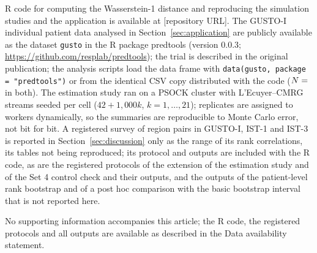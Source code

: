 \documentclass[AMA,Times1COL]{WileyNJDv5}
\begin{document}
R code for computing the Wasserstein-1 distance and reproducing the simulation studies and the application is available at [repository URL]. The GUSTO-I individual patient data analysed in Section~\ref{sec:application} are publicly available as the dataset \texttt{gusto} in the R package predtools (version 0.0.3; \url{https://github.com/resplab/predtools}); the trial is described in the original publication;\cite{gusto1993} the analysis scripts load the data frame with \texttt{data(gusto, package = "predtools")} or from the identical CSV copy distributed with the code ($N = \numval{gustoN}$ in both). The estimation study ran on a PSOCK cluster with L'Ecuyer--CMRG streams seeded per cell ($42 + 1{,}000k$, $k = 1, \ldots, 21$); replicates are assigned to workers dynamically, so the summaries are reproducible to Monte Carlo error, not bit for bit. A registered survey of region pairs in GUSTO-I, IST-1 and IST-3 is reported in Section~\ref{sec:discussion} only as the range of its rank correlations, its tables not being reproduced; its protocol and outputs are included with the R code, as are the registered protocols of the extension of the estimation study and of the Set 4 control check and their outputs, and the outputs of the patient-level rank bootstrap and of a post hoc comparison with the basic bootstrap interval that is not reported here.




No supporting information accompanies this article; the R code, the registered protocols and all outputs are available as described in the Data availability statement.

\appendix

\end{document}
